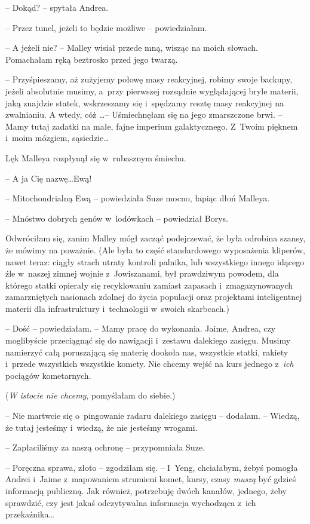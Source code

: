 \documentclass[oneside,polish,11pt,sfheadings]{mwbk}
\begin{document}
-- Dokąd? -- spytała Andrea.

-- Przez tunel, jeżeli to będzie możliwe -- powiedziałam.

-- A jeżeli nie? -- Malley wisiał przede mną, wisząc na moich słowach.
Pomachałam ręką beztrosko przed jego twarzą.

-- Przyśpieszamy, aż zużyjemy połowę masy reakcyjnej, robimy swoje
backupy, jeżeli absolutnie musimy, a~przy pierwszej rozsądnie
wyglądającej bryle materii, jaką znajdzie statek, wskrzeszamy się i~spędzamy resztę masy reakcyjnej na zwalnianiu. A wtedy, cóż \ldots  -- Uśmiechnęłam się na jego zmarszczone brwi. -- Mamy tutaj zadatki na małe,
fajne imperium galaktycznego. Z~Twoim pięknem i~moim mózgiem,
sąsiedzie\ldots 

Lęk Malleya rozpłynął się w~rubasznym śmiechu.

-- A ja Cię nazwę\ldots  Ewą!

-- Mitochondrialną Ewą -- powiedziała Suze mocno, łapiąc dłoń Malleya.

-- Mnóstwo dobrych genów w~lodówkach -- powiedział Borys.

Odwróciłam się, zanim Malley mógł zacząć podejrzewać, że była odrobina
szansy, że mówimy na poważnie. (Ale była to część standardowego
wyposażenia kliperów, nawet teraz: ciągły strach utraty kontroli
palnika, lub wszystkiego innego idącego źle w~naszej zimnej wojnie z~Jowiszanami, był prawdziwym powodem, dla którego statki opierały się
recyklowaniu zamiast zapasach i~zmagazynowanych zamarzniętych nasionach
zdolnej do życia populacji oraz projektami inteligentnej materii dla
infrastruktury i~technologii w~swoich skarbcach.)

-- Dość -- powiedziałam. -- Mamy pracę do wykonania. Jaime, Andrea, czy
moglibyście przeciągnąć się do nawigacji i~zestawu dalekiego zasięgu.
Musimy namierzyć całą poruszającą się materię dookoła nas, wszystkie
statki, rakiety i~przede wszystkich wszystkie komety. Nie chcemy wejść
na kurs jednego z~\textit{ich} pociągów kometarnych.

(\textit{W istocie nie chcemy}, pomyślałam do siebie.)

-- Nie martwcie się o~pingowanie radaru dalekiego zasięgu -- dodałam. -- Wiedzą, że tutaj jesteśmy i~wiedzą, że nie jesteśmy wrogami.

-- Zapłaciliśmy za naszą ochronę -- przypomniała Suze.

-- Poręczna sprawa, złoto -- zgodziłam się. -- I~Yeng, chciałabym, żebyś
pomogła Andrei i~Jaime z~mapowaniem strumieni komet, kursy, czasy
\textit{muszą} być gdzieś informacją publiczną. Jak również, potrzebuję
dwóch kanałów, jednego, żeby sprawdzić, czy jest jakaś odczytywalna
informacja wychodząca z~ich przekaźnika\ldots 
\end{document}
